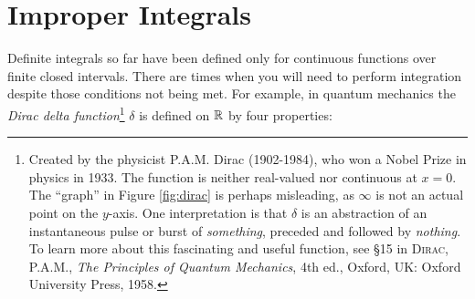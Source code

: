 {\begin{enumerate}[\bfseries 1.]
\end{enumerate}
}
\newpage
\section{Improper Integrals}\label{sec:improper-integrals}
Definite integrals so far have been defined only for continuous functions over
finite closed intervals. There are times when you will need to perform
integration despite those conditions not being met. For example, in quantum
mechanics the \emph{Dirac delta function}\footnote{Created by the physicist P.A.M. Dirac (1902-1984), who won a
Nobel Prize in physics in 1933. The function is neither real-valued nor
continuous at $x=0$. The ``graph'' in Figure \ref{fig:dirac} is perhaps
misleading, as $\infty$ is not an actual point on the $y$-axis. One
interpretation is that $\delta$ is an abstraction of an instantaneous pulse or
burst of \emph{something}, preceded and followed by \emph{nothing}.
To learn more about this fascinating and useful function, see \S 15 in
\textsc{Dirac, P.A.M.}, \emph{The Principles of Quantum Mechanics}, 4th ed.,
Oxford, UK: Oxford University Press, 1958.} $\delta$ is defined on $\mathbb{R}$ by
four properties:

